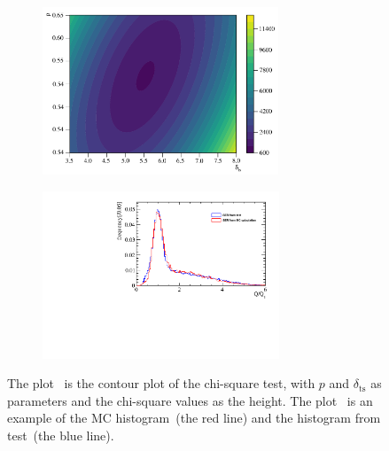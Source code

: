 \begin{figure}[ht]
    \centering
    \begin{subfigure}{0.47\textwidth}
        \centering
        \includegraphics[height=5cm]{pic/cour.pdf}
        \caption{}
        \label{fig:cour}
    \end{subfigure}
    \hfill
    \begin{subfigure}{0.47\textwidth}
        \centering
        \includegraphics[height=5cm]{pic/hist.pdf}
        \caption{}
        \label{fig:hist}
    \end{subfigure}
    \caption{The plot~ is the contour plot of the chi-square test, with $p$ and $\delta_{\mathrm{ts}}$ as parameters
        and the chi-square values as the height.
        The plot~ is an example of the MC histogram~(the red line) and the histogram from test~(the blue line).
    }
    \label{fig:chi}
\end{figure}

